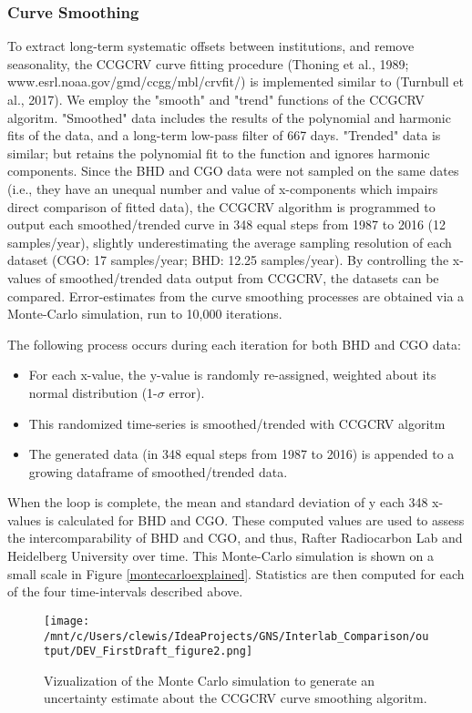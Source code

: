 \subsubsection{Curve Smoothing}
To extract long-term systematic offsets between institutions, and remove seasonality, the CCGCRV curve fitting procedure (Thoning et al., 1989; www.esrl.noaa.gov/gmd/ccgg/mbl/crvfit/) is implemented similar to (Turnbull et al., 2017). We employ the "smooth" and "trend" functions of the CCGCRV algoritm. "Smoothed" data includes the results of the polynomial and harmonic fits of the data, and a long-term low-pass filter of 667 days. "Trended" data is similar; but retains the polynomial fit to the function and ignores harmonic components. 
Since the BHD and CGO data were not sampled on the same dates (i.e., they have an unequal number and value of x-components which impairs direct comparison of fitted data), the CCGCRV algorithm is programmed to output each smoothed/trended curve in 348 equal steps from 1987 to 2016 (12 samples/year), slightly underestimating the average sampling resolution of each dataset (CGO: 17 samples/year; BHD: 12.25 samples/year). By controlling the x-values of smoothed/trended data output from CCGCRV, the datasets can be compared. 
Error-estimates from the curve smoothing processes are obtained via a Monte-Carlo simulation, run to 10,000 iterations. 

The following process occurs during each iteration for both BHD and CGO data: 
\begin{itemize}
	\item For each x-value, the y-value is  randomly re-assigned, weighted about its normal distribution (1-${\sigma}$ error). 
	\item This randomized time-series is smoothed/trended with CCGCRV algoritm 
	\item The generated data (in 348 equal steps from 1987 to 2016) is appended to a growing dataframe of smoothed/trended data.
\end{itemize}
When the loop is complete, the mean and standard deviation of y each 348 x-values is calculated for BHD and CGO. These computed values are used to assess the intercomparability of BHD and CGO, and thus, Rafter Radiocarbon Lab and Heidelberg University over time. This Monte-Carlo simulation is shown on a small scale in Figure \ref{montecarloexplained}. Statistics are then computed for each of the four time-intervals described above. 

\begin{figure}[h!]
  \texttt{[image: /mnt/c/Users/clewis/IdeaProjects/GNS/Interlab\_Comparison/output/DEV\_FirstDraft\_figure2.png]}
  \caption{Vizualization of the Monte Carlo simulation to generate an uncertainty estimate about the CCGCRV curve smoothing algoritm. }
  \label{fig:montecarloexplained}
\end{figure}


